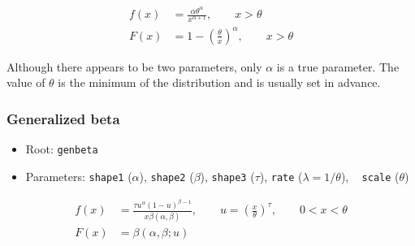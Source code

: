 \documentclass[x11names]{article}
\newcommand{\code}[1]{\texttt{#1}}
\begin{document}
\begin{align*}
  f(x) &= \frac{\alpha
    \theta^\alpha}{x^{\alpha+1}}, \qquad x > \theta \\
  F(x) &= 1 - \left( \frac{\theta}{x} \right)^\alpha, \qquad x >
  \theta
\end{align*}

Although there appears to be two parameters, only $\alpha$ is a true
parameter. The value of $\theta$ is the minimum of the distribution
and is usually set in advance.

\subsubsection*{Generalized beta}

\begin{itemize}
\item Root: \code{genbeta}
\item Parameters: \code{shape1} ($\alpha$),
      \code{shape2} ($\beta$),
      \code{shape3} ($\tau$),
      \code{rate}   ($\lambda = 1/\theta$),
       \code{scale}  ($\theta$)
\end{itemize}

\begin{align*}
  f(x) &= \frac{\tau u^\alpha (1 - u)^{\beta - 1}}{x \beta (\alpha, \beta)},
  \qquad u = \left( \frac{x}{\theta} \right)^\tau,
  \qquad 0 < x < \theta \\
  F(x) &= \beta (\alpha, \beta ; u)
\end{align*}


\end{document}

